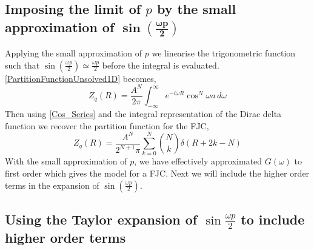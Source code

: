 \subsection{Imposing the limit of $p$ by the small approximation of $\boldsymbol{\sin\left(\frac{\omega p}{2}\right)}$}

Applying the small approximation of $p$ we linearise the trigonometric function such that $\sin\left(\frac{\omega p}{2}\right)\simeq\frac{\omega p}{2}$ before the integral is evaluated. \eqref{PartitionFunctionUnsolved1D}
becomes,
%
\begin{equation}
Z_{q}\left(R\right)=\frac{A^{N}}{2\pi}\int_{-\infty}^{\infty}e^{-i\omega R}\cos^{N}\omega a\, d\omega\label{pfSmallLimitP}
\end{equation}
%
Then using \eqref{Cos_Series} and the integral representation of the Dirac delta function we recover the partition function for the FJC,
%
\begin{equation}
Z_{q}\left(R\right)=\frac{A^{N}}{2^{N+1}\pi}\sum_{k=0}^{N}\binom{N}{k}\delta\left(R+2k-N\right)
\end{equation}
%
With the small approximation of $p$, we have effectively approximated $G\left(\omega\right)$ to first order which gives the model for a FJC. Next we will include the higher order terms in the expansion
of $\sin\left(\frac{\omega p}{2}\right)$.

\subsection{Using the Taylor expansion of $\sin \frac{\omega p}{2}$ to include higher order terms}

